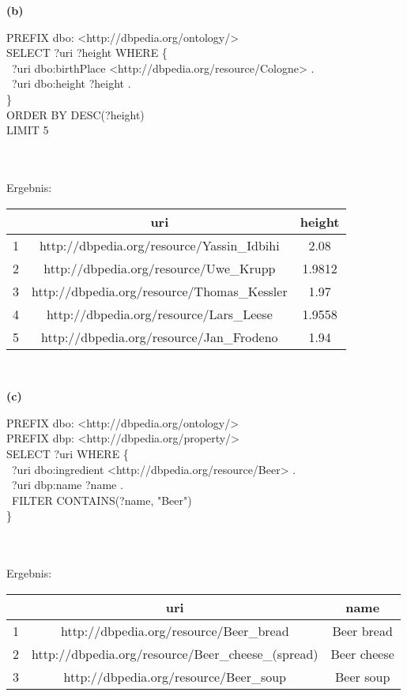 \documentclass[11pt, a4paper]{article}
\newcommand{\aufgabenteil}[1] {\textbf{(#1)}}
\begin{document}
\aufgabenteil{b}
\begin{adjustwidth}{20pt}{20pt}
\begin{tt}
PREFIX dbo:  <http://dbpedia.org/ontology/>\\
SELECT ?uri ?height WHERE \{\\
\null\qquad\ ?uri dbo:birthPlace <http://dbpedia.org/resource/Cologne> .\\
\null\qquad\ ?uri dbo:height ?height .\\
\}\\
ORDER BY DESC(?height)\\
LIMIT 5
\end{tt}
\\ \ \\
Ergebnis:\\
\begin{tabular}{ |c|c|c| } 
 \hline
 & uri & height \\ 
 \hline
1 & http://dbpedia.org/resource/Yassin\_Idbihi & 2.08\\ 
2 & http://dbpedia.org/resource/Uwe\_Krupp & 1.9812\\ 
3 & http://dbpedia.org/resource/Thomas\_Kessler & 1.97\\ 
4 & http://dbpedia.org/resource/Lars\_Leese & 1.9558\\ 
5 & http://dbpedia.org/resource/Jan\_Frodeno & 1.94\\ 
 \hline
\end{tabular} \ \\
\end{adjustwidth}
\aufgabenteil{c}
\begin{adjustwidth}{20pt}{20pt}
\begin{tt}
PREFIX dbo:  <http://dbpedia.org/ontology/>\\
PREFIX dbp: <http://dbpedia.org/property/>\\
SELECT ?uri WHERE \{\\
\null\qquad\ ?uri dbo:ingredient <http://dbpedia.org/resource/Beer> .\\
\null\qquad\ ?uri dbp:name ?name .\\
\null\qquad\ FILTER CONTAINS(?name, "Beer")\\
\}
\end{tt}
\\ \ \\
Ergebnis:\\
\begin{tabular}{ |c|c|c| } 
 \hline
 & uri & name \\ 
 \hline
1 & http://dbpedia.org/resource/Beer\_bread & Beer bread\\ 
2 & http://dbpedia.org/resource/Beer\_cheese\_(spread) & Beer cheese\\ 
3 & http://dbpedia.org/resource/Beer\_soup & Beer soup\\
 \hline
\end{tabular} \ \\
\end{adjustwidth}
\end{document}
